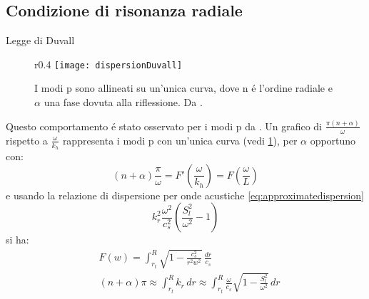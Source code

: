 \subsection{Condizione di risonanza radiale}

\begin{frame}{Legge di Duvall}

\begin{figure}[19]{r}{0.4\textwidth}
\centering
\texttt{[image: dispersionDuvall]}
\caption{I modi p sono allineati su un'unica curva, dove n \'e l'ordine radiale e $\alpha$ una fase dovuta alla riflessione. Da \cite{duv82dispersion}.}\label{fig:duv82dispersion}
\end{figure}

Questo comportamento \'e stato osservato per i modi p da \citet{duv82dispersion}. Un grafico di $\frac{\pi(n+\alpha)}{\omega}$ rispetto a $\frac{\omega}{k_h}$ rappresenta i modi p con un'unica curva (vedi \ref{fig:duv82dispersion}), per $\alpha$ opportuno con:
\begin{equation}
(n+\alpha)\frac{\pi}{\omega}=F'(\frac{\omega}{k_h})=F(\frac{\omega}{L})\label{eq:duvallr}
\end{equation}
e usando la relazione di dispersione per onde acustiche \eqref{eq:approximatedispersion}
\begin{equation}
k_r^2\frac{\omega^2}{c_s^2}(\frac{S_l^2}{\omega^2}-1)
\end{equation}
si ha:
\begin{align}
&F(w)=\int_{r_t}^R\sqrt{1-\frac{c_s^2}{r^2w^2}}\,\frac{dr}{c_s}\label{eq:duvallf}\\
&(n+\alpha)\pi\approx\int_{r_t}^Rk_r\,dr\approx\int_{r_t}^R\frac{\omega}{c_s}\sqrt{1-\frac{S_l^2}{\omega^2}}\,dr\label{eq:duvallexpli}
\end{align}

\end{frame}

